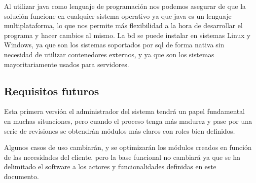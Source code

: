 Al utilizar java como lenguaje de programación nos podemos asegurar de que la solución funcione en cualquier sistema operativo ya que java es un lenguaje multiplataforma, lo que nos permite más flexibilidad a la hora de desarrollar el programa y hacer cambios al mismo. La \gls{bd} se puede instalar en sistemas Linux y Windows, ya que son los sistemas soportados por \gls{sql} de forma nativa sin necesidad de utilizar contenedores externos, y ya que son los sistemas mayoritariamente usados para servidores.

\subsection{Requisitos futuros}
Esta primera versión el administrador del sistema tendrá un papel fundamental en
muchas situaciones, pero cuando el proceso tenga más madurez y pase por una serie
de revisiones se obtendrán módulos más claros con roles bien definidos.

Algunos casos de uso cambiarán, y se optimizarán los módulos creados en función de
las necesidades del cliente, pero la base funcional no cambiará ya que se ha
delimitado el software a los actores y funcionalidades definidas en este documento.

